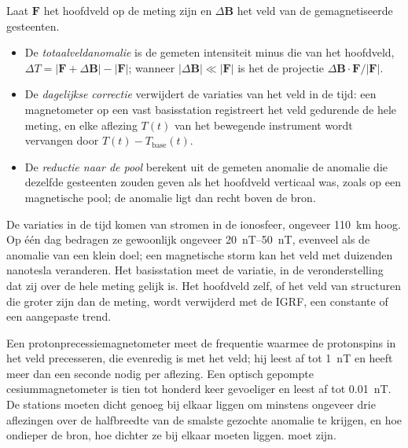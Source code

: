 \begin{definition}\label{def:b3:field-lab-methods-3:magnetic}
Laat $\mathbf{F}$ het hoofdveld op de meting zijn en $\Delta\mathbf{B}$
het veld van de gemagnetiseerde gesteenten.
\begin{itemize}
  \item De \emph{totaalveldanomalie} is de gemeten
        intensiteit minus die van het hoofdveld, $\Delta T =
        |\mathbf{F} + \Delta\mathbf{B}| - |\mathbf{F}|$; wanneer
        $|\Delta\mathbf{B}| \ll |\mathbf{F}|$ is het de projectie
        $\Delta\mathbf{B}\cdot\mathbf{F}/|\mathbf{F}|$.
  \item De \emph{dagelijkse correctie} verwijdert
        de variaties van het veld in de tijd: een magnetometer op een vast
        basisstation registreert het veld gedurende de hele meting, en elke
        aflezing $T(t)$ van het bewegende instrument wordt vervangen door $T(t) -
        T_\mathrm{base}(t)$.
  \item De \emph{reductie naar de pool}
        berekent uit de gemeten anomalie de anomalie die dezelfde gesteenten
        zouden geven als het hoofdveld verticaal was, zoals op een magnetische
        pool; de anomalie ligt dan recht boven de bron.
\end{itemize}
\end{definition}

De variaties in de tijd komen van stromen in de ionosfeer, ongeveer
\qty{110}{km} hoog. Op één dag bedragen ze gewoonlijk ongeveer
\qtyrange{20}{50}{nT}, evenveel als de anomalie van een klein doel; een
magnetische storm kan het veld met duizenden nanotesla veranderen. Het
basisstation meet de variatie, in de veronderstelling dat zij over de hele
meting gelijk is. Het hoofdveld zelf, of het veld van structuren die groter
zijn dan de meting, wordt verwijderd met de IGRF, een constante of een
aangepaste trend.

Een protonprecessiemagnetometer meet de frequentie waarmee de protonspins
in het veld precesseren, die evenredig is met het veld; hij leest af tot
\qty{1}{nT} en heeft meer dan een seconde nodig per aflezing. Een optisch
gepompte cesiummagnetometer is tien tot honderd keer gevoeliger en leest af
tot \qty{0.01}{nT}. De stations moeten dicht genoeg bij elkaar liggen om
minstens ongeveer drie aflezingen over de halfbreedte van de smalste gezochte
anomalie te krijgen, en hoe ondieper de bron, hoe dichter ze bij elkaar moeten liggen.
moet zijn.


